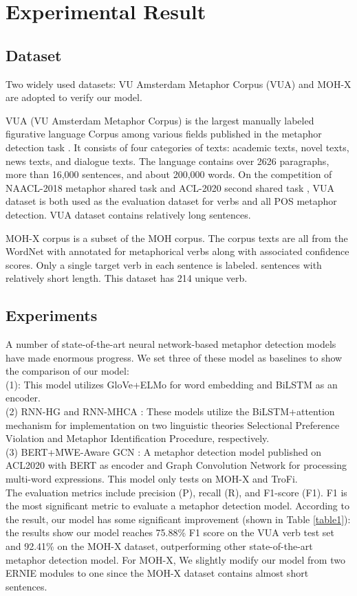 \documentclass[11pt,a4paper]{article}
\begin{document}
\section{Experimental Result}
\subsection{Dataset}
Two widely used datasets: VU Amsterdam Metaphor Corpus (VUA) and MOH-X are adopted to verify our model.

VUA (VU Amsterdam Metaphor Corpus) is the largest manually labeled figurative language Corpus among various fields published in the metaphor detection task \cite{krennmayr2017vu}. It consists of four categories of texts: academic texts, novel texts, news texts, and dialogue texts. The language contains over 2626 paragraphs, more than 16,000 sentences, and about 200,000 words. On the competition of NAACL-2018 metaphor shared task \cite{leong2018report} and ACL-2020 second shared task \cite{leong-etal-2020-report}, VUA dataset is both used as the evaluation dataset for verbs and all POS metaphor detection.  VUA dataset contains relatively long sentences.

MOH-X corpus \cite{mohammad2016metaphor} is a subset of the MOH corpus. The corpus texts are all from the WordNet with annotated for metaphorical verbs along with associated confidence scores. Only a single target verb in each sentence is labeled. sentences with relatively short length. This dataset has 214 unique verb.

\subsection{Experiments}

A number of state-of-the-art neural network-based metaphor detection models have made enormous progress. We set three of these model as baselines to show the comparison of our model:\\
(1)\citet{gao2018neural}: This model utilizes GloVe+ELMo for word embedding and BiLSTM as an encoder.\\
(2) RNN-HG and RNN-MHCA \cite{mao2019end}: These models utilize the BiLSTM+attention mechanism for implementation on two linguistic theories Selectional Preference Violation and Metaphor Identification Procedure, respectively.\\
(3) BERT+MWE-Aware GCN \cite{rohanian-etal-2020-verbal}: A metaphor detection model published on ACL2020 with BERT as encoder and Graph Convolution Network for processing multi-word expressions. This model only tests on MOH-X and TroFi.\\
The evaluation metrics include precision (P), recall (R), and F1-score (F1). F1 is the most significant metric to evaluate a metaphor detection model. According to the result, our model has some significant improvement (shown in Table \ref{table1}): the results show our model reaches 75.88\% F1 score on the VUA verb test set and 92.41\% on the MOH-X dataset, outperforming other state-of-the-art metaphor detection model. For MOH-X, We slightly modify our model from two ERNIE modules to one since the MOH-X dataset contains almost short sentences.
\\
\end{document}
